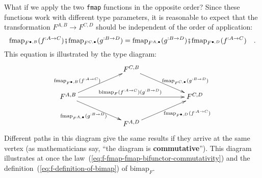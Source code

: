 What if we apply the two \lstinline!fmap! functions in the opposite
order? Since these functions work with different type parameters,
it is reasonable to expect that the transformation $F^{A,B}\rightarrow F^{C,D}$
should be independent of the order of application:
\begin{equation}
\text{fmap}_{F^{\bullet,B}}(f^{:A\rightarrow C})\bef\text{fmap}_{F^{C,\bullet}}(g^{:B\rightarrow D})=\text{fmap}_{F^{A,\bullet}}(g^{:B\rightarrow D})\bef\text{fmap}_{F^{\bullet,D}}(f^{:A\rightarrow C})\quad.\label{eq:f-fmap-fmap-bifunctor-commutativity}
\end{equation}
This equation is illustrated by the type diagram:
\[
\xymatrix{\xyScaleY{2.0pc}\xyScaleX{5.0pc} & F^{C,B}\ar[rd]\sp(0.6){\ ~~\text{fmap}_{F^{C,\bullet}}(g^{:B\rightarrow D})}\\
F^{A,B}\ar[ru]\sp(0.4){\text{fmap}_{F^{\bullet,B}}(f^{:A\rightarrow C})~~~}\ar[rd]\sb(0.5){\text{fmap}_{F^{A,\bullet}}(g^{:B\rightarrow D})~~\ }\ar[rr]\sp(0.5){\text{bimap}_{F}(f^{:A\rightarrow C})(g^{:B\rightarrow D})\ } &  & F^{C,D}\\
 & F^{A,D}\ar[ru]\sb(0.6){~~~~\text{fmap}_{F^{\bullet,D}}(f^{:A\rightarrow C})}
}
\]
Different paths in this diagram give the same results if they arrive
at the same vertex (as mathematicians say, \textsf{``}the diagram is \textbf{commutative}\textsf{''}).
This diagram illustrates at once the law~(\ref{eq:f-fmap-fmap-bifunctor-commutativity})
and the definition~(\ref{eq:f-definition-of-bimap}) of $\text{bimap}_{F}$.

